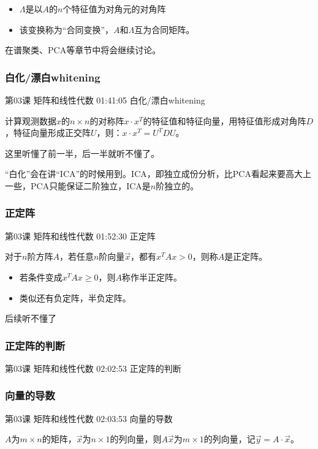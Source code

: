 \documentclass[UTF8]{ctexart}
\begin{document}
\begin{itemize}
\item $\Lambda$是以$A$的$n$个特征值为对角元的对角阵
\item 该变换称为“合同变换”，$A$和$\Lambda$互为合同矩阵。
\end{itemize}

在谱聚类、PCA等章节中将会继续讨论。

\subsubsection{白化/漂白whitening}

第03课 矩阵和线性代数 01:41:05 白化/漂白whitening

计算观测数据$x$的$n \times n$的对称阵$x \cdot x^{T}$的特征值和特征向量，用特征值形成对角阵$D$，特征向量形成正交阵$U$，则：$x \cdot x^{T} = U^{T}DU$。

这里听懂了前一半，后一半就听不懂了。

“白化”会在讲“ICA”的时候用到。ICA，即独立成份分析，比PCA看起来要高大上一些，PCA只能保证二阶独立，ICA是$n$阶独立的。

\subsubsection{正定阵}

第03课 矩阵和线性代数 01:52:30 正定阵

对于$n$阶方阵$A$，若任意$n$阶向量$\vec{x}$，都有$x^{T}Ax > 0$，则称$A$是正定阵。

\begin{itemize}
\item 若条件变成$x^{T}Ax \geq 0$，则$A$称作半正定阵。
\item 类似还有负定阵，半负定阵。
\end{itemize}

后续听不懂了

\subsubsection{正定阵的判断}

第03课 矩阵和线性代数 02:02:53 正定阵的判断

\subsubsection{向量的导数}

第03课 矩阵和线性代数 02:03:53 向量的导数

$A$为$m \times n$的矩阵，$\vec{x}$为$n \times 1$的列向量，则$A\vec{x}$为$m \times 1$的列向量，记$\vec{y}=A \cdot \vec{x}$。
\end{document}

